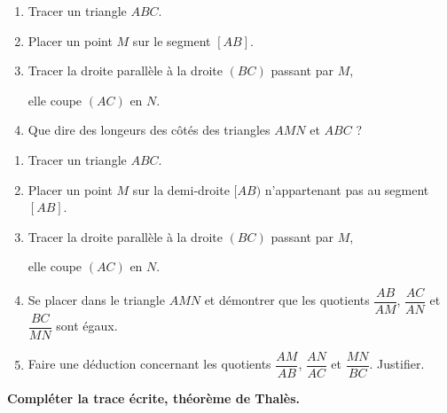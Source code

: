 \begin{activite}
        \begin{minipage}{0.6\textwidth}
            \begin{enumerate}
                \item Tracer un triangle $ABC$.
                \item Placer un point $M$ sur le segment $[AB]$.
                \item Tracer la droite parallèle à la droite $(BC)$ passant par $M$,
                
                elle coupe $(AC)$ en $N$.
                \item Que dire des longeurs des côtés des triangles $AMN$ et $ABC$ ?
            \end{enumerate}
        \end{minipage}
        \hspace*{1cm}
        \begin{minipage}{0.4\textwidth}
        \end{minipage}

    \partie[Configuration emboîtée - {$M \in [AB)$ ; $M \notin [AB]$}]
        \begin{minipage}{0.6\textwidth}
            \begin{enumerate}
                \item Tracer un triangle $ABC$.
                \item Placer un point $M$ sur la demi-droite $[AB)$ n'appartenant pas au segment $[AB]$.
                \item Tracer la droite parallèle à la droite $(BC)$ passant par $M$,
                
                elle coupe $(AC)$ en $N$.
                \item Se placer dans le triangle $AMN$ et démontrer que les quotients
                $\dfrac{AB}{AM}$, $\dfrac{AC}{AN}$ et $\dfrac{BC}{MN}$ sont égaux.
                \item Faire une déduction concernant les quotients $\dfrac{AM}{AB}$, $\dfrac{AN}{AC}$ et $\dfrac{MN}{BC}$. Justifier.
            \end{enumerate}
        \end{minipage}
        \hspace*{1cm}
        \begin{minipage}{0.4\textwidth}
        \end{minipage}

        \textbf{Compléter la trace écrite, théorème de Thalès.}
\end{activite}